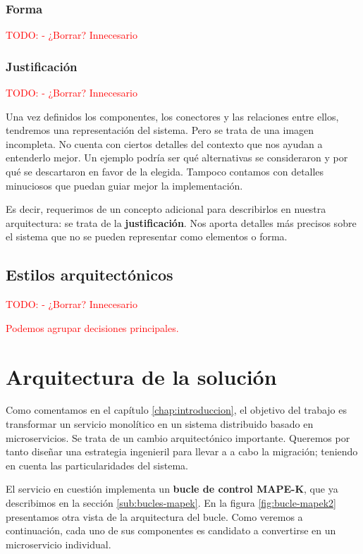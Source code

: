 \subsubsection{Forma}

\textcolor{red}{TODO:  - ¿Borrar?  Innecesario}

\subsubsection{Justificación}

\textcolor{red}{TODO:  - ¿Borrar?  Innecesario}

Una vez definidos los componentes, los conectores y las relaciones entre ellos, tendremos una representación del sistema. Pero se trata de una imagen incompleta. No cuenta con ciertos detalles del contexto que nos ayudan a entenderlo mejor. Un ejemplo podría ser qué alternativas se consideraron y por qué se descartaron en favor de la elegida. Tampoco contamos con detalles minuciosos que puedan guiar mejor la implementación.

Es decir, requerimos de un concepto adicional para describirlos en nuestra arquitectura: se trata de la \textbf{justificación}. \cite{perryFoundationsStudySoftware1992} Nos aporta detalles más precisos sobre el sistema que no se pueden representar como elementos o forma.

\subsection{Estilos arquitectónicos}

\textcolor{red}{TODO:  - ¿Borrar?  Innecesario}

\textcolor{red}{Podemos agrupar decisiones principales.}

\section{Arquitectura de la solución}

Como comentamos en el capítulo \ref{chap:introduccion}, el objetivo del trabajo es transformar un servicio monolítico en un sistema distribuido basado en microservicios. Se trata de un cambio arquitectónico importante. Queremos por tanto diseñar una estrategia ingenieril para llevar a a cabo la migración; teniendo en cuenta las particularidades del sistema.

El servicio en cuestión implementa un \textbf{bucle de control MAPE-K}\cite{ibmcorporationArchitecturalBlueprintAutonomic2006,fonsServiciosAdaptivereadyPara2021}, que ya describimos en la sección \ref{sub:bucles-mapek}. En la figura \ref{fig:bucle-mapek2} presentamos otra vista de la arquitectura del bucle. Como veremos a continuación, cada uno de sus componentes es candidato a convertirse en un microservicio individual.

